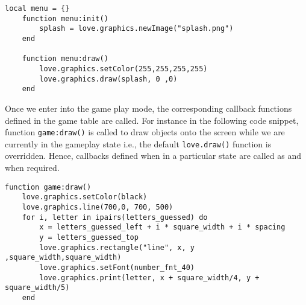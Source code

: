 \begin{minipage}[t]{1\linewidth}
\begin{lstlisting}[language={[5.2]Lua}, %
  title={Splash Screen}, label=splash]
	local menu = {}
	function menu:init()
   		splash = love.graphics.newImage("splash.png")
	end

	function menu:draw()
    	love.graphics.setColor(255,255,255,255)
    	love.graphics.draw(splash, 0 ,0)
	end

\end{lstlisting}
\end{minipage}

Once we enter into the game play mode, the corresponding callback functions defined in the game table are called. For instance in the following code snippet, function \texttt{game:draw()} is called to draw objects onto the screen while we are currently in the gameplay state i.e., the default \texttt{love.draw()} function is overridden. Hence, callbacks defined when in a particular state are called as and when required.


\begin{minipage}[t]{1\linewidth}
\begin{lstlisting}[language={[5.2]Lua}, %
  title={Game State}, label=game]
	function game:draw()
    love.graphics.setColor(black)
    love.graphics.line(700,0, 700, 500)
    for i, letter in ipairs(letters_guessed) do
        x = letters_guessed_left + i * square_width + i * spacing
        y = letters_guessed_top
        love.graphics.rectangle("line", x, y ,square_width,square_width)
        love.graphics.setFont(number_fnt_40)
        love.graphics.print(letter, x + square_width/4, y + square_width/5)
    end

\end{lstlisting}
\end{minipage}

